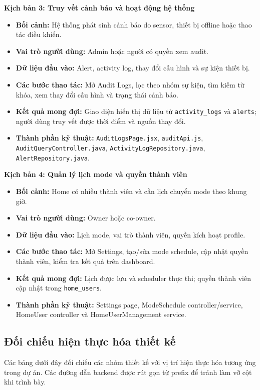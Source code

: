\textbf{Kịch bản 3: Truy vết cảnh báo và hoạt động hệ thống}
\begin{itemize}
    \item \textbf{Bối cảnh:} Hệ thống phát sinh cảnh báo do sensor, thiết bị offline hoặc thao tác điều khiển.
    \item \textbf{Vai trò người dùng:} Admin hoặc người có quyền xem audit.
    \item \textbf{Dữ liệu đầu vào:} Alert, activity log, thay đổi cấu hình và sự kiện thiết bị.
    \item \textbf{Các bước thao tác:} Mở Audit Logs, lọc theo nhóm sự kiện, tìm kiếm từ khóa, xem thay đổi cấu hình và trạng thái cảnh báo.
    \item \textbf{Kết quả mong đợi:} Giao diện hiển thị dữ liệu từ \texttt{activity\_logs} và \texttt{alerts}; người dùng truy vết được thời điểm và nguồn thay đổi.
    \item \textbf{Thành phần kỹ thuật:} \texttt{AuditLogsPage.jsx}, \texttt{auditApi.js}, \texttt{AuditQueryController.java}, \texttt{ActivityLogRepository.java}, \texttt{AlertRepository.java}.
\end{itemize}

\textbf{Kịch bản 4: Quản lý lịch mode và quyền thành viên}
\begin{itemize}
    \item \textbf{Bối cảnh:} Home có nhiều thành viên và cần lịch chuyển mode theo khung giờ.
    \item \textbf{Vai trò người dùng:} Owner hoặc co-owner.
    \item \textbf{Dữ liệu đầu vào:} Lịch mode, vai trò thành viên, quyền kích hoạt profile.
    \item \textbf{Các bước thao tác:} Mở Settings, tạo/sửa mode schedule, cập nhật quyền thành viên, kiểm tra kết quả trên dashboard.
    \item \textbf{Kết quả mong đợi:} Lịch được lưu và scheduler thực thi; quyền thành viên cập nhật trong \texttt{home\_users}.
    \item \textbf{Thành phần kỹ thuật:} Settings page, ModeSchedule controller/service, HomeUser controller và HomeUserManagement service.
\end{itemize}

\subsection{Đối chiếu hiện thực hóa thiết kế}

Các bảng dưới đây đối chiếu các nhóm thiết kế với vị trí hiện thực hóa tương ứng trong dự án. Các đường dẫn backend được rút gọn từ prefix  để tránh làm vỡ cột khi trình bày.

